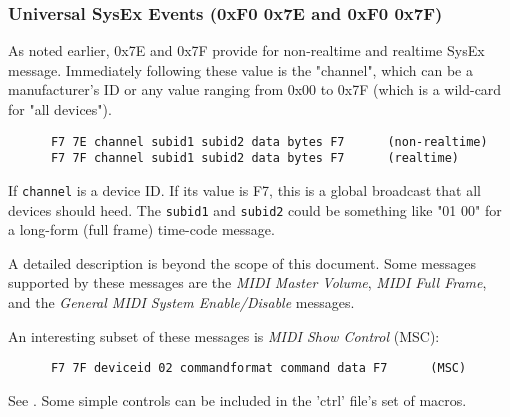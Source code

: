 \subsubsection{Universal SysEx Events (0xF0 0x7E and 0xF0 0x7F)}
\label{subsubsec:midi_format_meta_universalsysex_event}

   As noted earlier, 0x7E and 0x7F provide for non-realtime and realtime SysEx
   message.
   Immediately following these value is the "channel", which can be a
   manufacturer's ID or any value ranging from 0x00 to 0x7F (which is a
   wild-card for "all devices").

   \begin{verbatim}
      F7 7E channel subid1 subid2 data bytes F7      (non-realtime)
      F7 7F channel subid1 subid2 data bytes F7      (realtime)
   \end{verbatim}

   If \texttt{channel} is a device ID.
   If its value is F7, this is a global broadcast that all devices
   should heed.
   The \texttt{subid1} and \texttt{subid2}
   could be something like "01 00" for a long-form
   (full frame) time-code message.


   A detailed description is beyond the scope of this document.
   Some messages supported by these messages are the
   \textsl{MIDI Master Volume},
   \textsl{MIDI Full Frame},
   and the \textsl{General MIDI System Enable/Disable}
   messages.

   An interesting subset of these messages is \textsl{MIDI Show Control}
   (MSC):

   \begin{verbatim}
      F7 7F deviceid 02 commandformat command data F7      (MSC)
   \end{verbatim}

   See \cite{msc}.
   Some simple controls can be included in the 'ctrl' file's set of macros.

